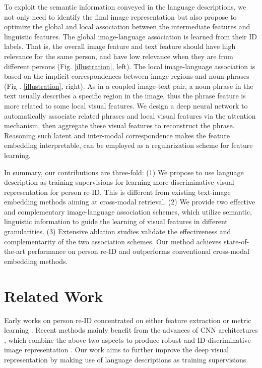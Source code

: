 \documentclass[runningheads]{llncs}
\begin{document}
 
 
 To exploit the semantic information conveyed in the language descriptions, we not only need to identify the final image representation but also propose to optimize the global and local association between the intermediate features and linguistic features. The global image-language association is learned from their ID labels. That is, the overall image feature and text feature should have high relevance for the same person, and have low relevance when they are from different persons (Fig. \ref{illustration}, left). The local image-language association is based on the implicit correspondences between image regions and noun phrases (Fig . \ref{illustration}, right). As in a coupled image-text pair, a noun phrase in the text usually describes a specific region in the image, thus the phrase feature is more related to some local visual features. We design a deep neural network to automatically associate related phrases and local visual features via the attention mechanism, then aggregate these visual features to reconstruct the phrase. Reasoning such latent and inter-modal correspondence makes the feature embedding interpretable, can be employed as a regularization scheme for feature learning.
 
In summary, our contributions are three-fold: (1) We propose to use language description as training supervisions for learning more discriminative visual representation for person re-ID. This is different from existing text-image embedding methods aiming at cross-modal retrieval. (2) We provide two effective and complementary image-language association schemes, which utilize semantic,  linguistic information to guide the learning of visual features in different granularities. (3) Extensive ablation studies validate the effectiveness and complementarity of the two association schemes. Our method achieves state-of-the-art performance on person re-ID and outperforms conventional cross-modal embedding methods. 
                      
\section{Related Work}

Early works on person re-ID concentrated on either feature extraction \cite{wang2007shape, ma2012bicov, farenzena2010person}  or metric learning \cite{koestinger2012large, chen2015similarity, chen2016similarity, mignon2012pcca, chen2017exemplar}. Recent methods mainly benefit from the advances of CNN architectures \cite{Lishuang_2017_CVPR},  which combine the above two aspects to produce robust and ID-discriminative image representation \cite{Li_2014_CVPR, ahmed2015improved, varior2016gated, wang2016joint, shen2018end, chen2018group}. Our work aims to further improve the deep visual representation by making use of language descriptions as training supervisions.
\end{document}

